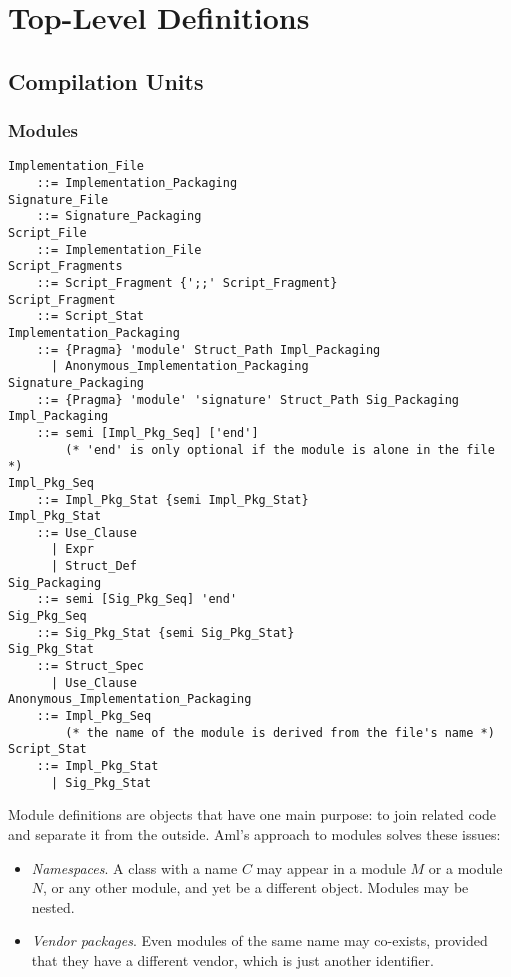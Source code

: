 
\chapter{Top-Level Definitions}

\minitoc

\newpage

\section{Compilation Units}
\label{sec:compilation-units}

\subsection{Modules}
\label{sec:modules}

\grammar\begin{lstlisting}
Implementation_File
    ::= Implementation_Packaging
Signature_File
    ::= Signature_Packaging
Script_File
    ::= Implementation_File
Script_Fragments
    ::= Script_Fragment {';;' Script_Fragment}
Script_Fragment
    ::= Script_Stat
Implementation_Packaging 
    ::= {Pragma} 'module' Struct_Path Impl_Packaging
      | Anonymous_Implementation_Packaging
Signature_Packaging
    ::= {Pragma} 'module' 'signature' Struct_Path Sig_Packaging
Impl_Packaging
    ::= semi [Impl_Pkg_Seq] ['end']  
        (* 'end' is only optional if the module is alone in the file *)
Impl_Pkg_Seq
    ::= Impl_Pkg_Stat {semi Impl_Pkg_Stat}
Impl_Pkg_Stat 
    ::= Use_Clause
      | Expr
      | Struct_Def
Sig_Packaging
    ::= semi [Sig_Pkg_Seq] 'end'
Sig_Pkg_Seq 
    ::= Sig_Pkg_Stat {semi Sig_Pkg_Stat}
Sig_Pkg_Stat
    ::= Struct_Spec
      | Use_Clause
Anonymous_Implementation_Packaging
    ::= Impl_Pkg_Seq
        (* the name of the module is derived from the file's name *)
Script_Stat
    ::= Impl_Pkg_Stat
      | Sig_Pkg_Stat
\end{lstlisting}

Module definitions are objects that have one main purpose: to join related code and separate it from the outside. Aml's approach to modules solves these issues: 
\begin{itemize}
  \item {\em Namespaces}. A class with a name $C$ may appear in a module $M$ or a module $N$, or any other module, and yet be a different object. Modules may be nested.
  \item {\em Vendor packages}. Even modules of the same name may co-exists, provided that they have a different vendor, which is just another identifier. 
\end{itemize}

